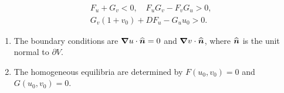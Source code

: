 \documentclass[a4paper, 12pt]{article}
\begin{document}
\begin{enumerate}[label={\bf \arabic{*}.\;}, ref={\arabic{*}},itemsep=3ex, left=0ex]
{\begin{enumerate}[label=(\alph*)]
{              \begin{align*}
                &F_u + G_v <0, \quad F_u G_v - F_vG_u >0,\\
                &G_v(1+v_0) + D F_u - G_u u_0 >0.
              \end{align*}
            }
        \end{enumerate}
      }
      {
        \begin{enumerate}[label=(\alph*)]
          \item The boundary conditions are
            $\vnabla u \cdot \uv{n} =0$ and $\vnabla v \cdot \uv{n}$, where $\uv{n}$ is the unit normal to $\partial{V}$.

          \item The homogeneous equilibria are determined by
            $F(u_0,v_0)=0$ and $G(u_0,v_0)=0$.


\end{enumerate}}
\end{enumerate}
\end{document}
